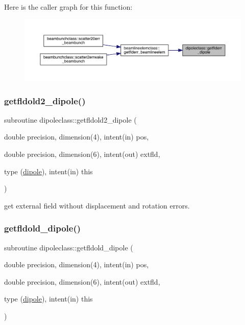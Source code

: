 Here is the caller graph for this function\+:\nopagebreak
\begin{figure}[H]
\begin{center}
\leavevmode
\includegraphics[width=350pt]{namespacedipoleclass_a0a75204835a2e4dd1ea67c1ee32e62fe_icgraph}
\end{center}
\end{figure}
\mbox{\label{namespacedipoleclass_abab9a0945263c7c75aa7ef9f94c07b9a}} 
\subsubsection{\texorpdfstring{getfldold2\_dipole()}{getfldold2\_dipole()}}
{\footnotesize\ttfamily subroutine dipoleclass\+::getfldold2\+\_\+dipole (\begin{DoxyParamCaption}\item[{double precision, dimension(4), intent(in)}]{pos,  }\item[{double precision, dimension(6), intent(out)}]{extfld,  }\item[{type (\mbox{\hyperlink{namespacedipoleclass_structdipoleclass_1_1dipole}{dipole}}), intent(in)}]{this }\end{DoxyParamCaption})}



get external field without displacement and rotation errors. 

\mbox{\label{namespacedipoleclass_a417b00dd769e534be3746eaeff56c074}} 
\subsubsection{\texorpdfstring{getfldold\_dipole()}{getfldold\_dipole()}}
{\footnotesize\ttfamily subroutine dipoleclass\+::getfldold\+\_\+dipole (\begin{DoxyParamCaption}\item[{double precision, dimension(4), intent(in)}]{pos,  }\item[{double precision, dimension(6), intent(out)}]{extfld,  }\item[{type (\mbox{\hyperlink{namespacedipoleclass_structdipoleclass_1_1dipole}{dipole}}), intent(in)}]{this }\end{DoxyParamCaption})}



